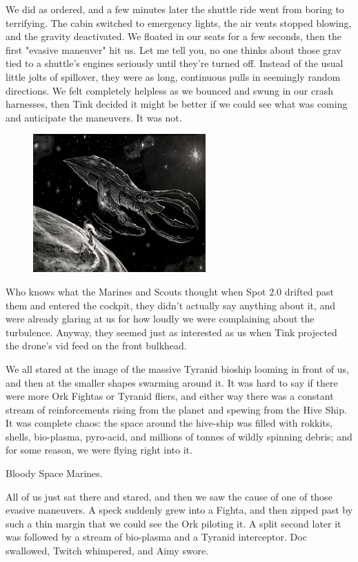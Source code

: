 We did as ordered, and a few minutes later the shuttle ride went from boring to terrifying. 
The cabin switched to emergency lights, the air vents stopped blowing, and the gravity deactivated. 
We floated in our seats for a few seconds, then the first "evasive maneuver" hit us. 
Let me tell you, no one thinks about those grav tied to a shuttle's engines seriously until they're turned off. 
Instead of the usual little jolts of spillover, they were as long, continuous pulls in seemingly random directions. 
We felt completely helpless as we bounced and swung in our crash harnesses, then Tink decided it might be better if we could see what was coming and anticipate the maneuvers. 
It was not.

\begin{figure}
	\begin{center}
		\includegraphics[width=\figwidth]{pics/12/29.png}
	\end{center}
\end{figure}
Who knows what the Marines and Scouts thought when Spot 2.0 drifted past them and entered the cockpit, they didn't actually say anything about it, and were already glaring at us for how loudly we were complaining about the turbulence. 
Anyway, they seemed just as interested as us when Tink projected the drone's vid feed on the front bulkhead.

We all stared at the image of the massive Tyranid bioship looming in front of us, and then at the smaller shapes swarming around it. 
It was hard to say if there were more Ork Fightas or Tyranid fliers, and either way there was a constant stream of reinforcements rising from the planet and spewing from the Hive Ship. 
It was complete chaos: 
the space around the hive-ship was filled with rokkits, shells, bio-plasma, pyro-acid, and millions of tonnes of wildly spinning debris; 
and for some reason, we were flying right into it.

Bloody Space Marines.

All of us just sat there and stared, and then we saw the cause of one of those evasive maneuvers. 
A speck suddenly grew into a Fighta, and then zipped past by such a thin margin that we could see the Ork piloting it. 
A split second later it was followed by a stream of bio-plasma and a Tyranid interceptor. 
Doc swallowed, Twitch whimpered, and Aimy swore.

